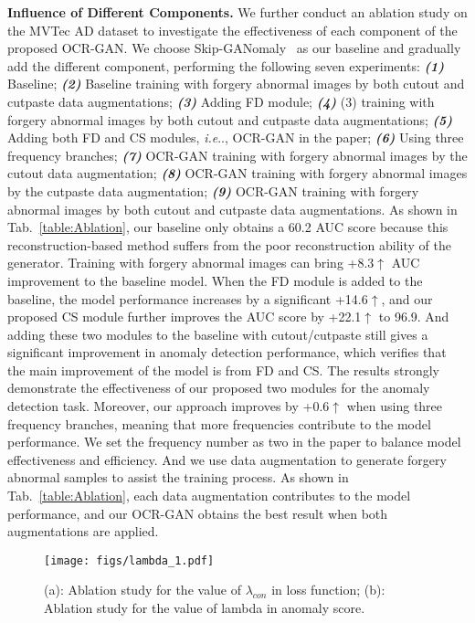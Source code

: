 \documentclass[lettersize,journal]{IEEEtran}
\makeatletter
\DeclareRobustCommand\onedot{\futurelet\@let@token\@onedot}
\def\@onedot{\ifx\@let@token.\else.\null\fi\xspace}
\def\ie{\emph{i.e}\onedot} \def\Ie{\emph{I.e}\onedot}
\makeatother
\begin{document}
\noindent\textbf{Influence of Different Components.} We further conduct an ablation study on the MVTec AD dataset to investigate the effectiveness of each component of the proposed OCR-GAN. We choose Skip-GANomaly~\cite{akccay2019skip} as our baseline and gradually add the different component, performing the following seven experiments: \textbf{\emph{(1)}} Baseline; \textbf{\emph{(2)}} Baseline training with forgery abnormal images by both cutout and cutpaste data augmentations; \textbf{\emph{(3)}} Adding FD module; \textbf{\emph{(4)}} (3) training with forgery abnormal images by both cutout and cutpaste data augmentations; \textbf{\emph{(5)}} Adding both FD and CS modules, \ie, OCR-GAN in the paper; \textbf{\emph{(6)}} Using three frequency branches; \textbf{\emph{(7)}} OCR-GAN training with forgery abnormal images by the cutout data augmentation; \textbf{\emph{(8)}} OCR-GAN training with forgery abnormal images by the cutpaste data augmentation; \textbf{\emph{(9)}} OCR-GAN training with forgery abnormal images by both cutout and cutpaste data augmentations. As shown in Tab.~\ref{table:Ablation}, our baseline only obtains a 60.2 AUC score because this reconstruction-based method suffers from the poor reconstruction ability of the generator. Training with forgery abnormal images can bring +8.3$\uparrow$ AUC improvement to the baseline model. When the FD module is added to the baseline, the model performance increases by a significant +14.6$\uparrow$, and our proposed CS module further improves the AUC score by +22.1$\uparrow$ to 96.9. And adding these two modules to the baseline with cutout/cutpaste still gives a significant improvement in anomaly detection performance, which verifies that the main improvement of the model is from FD and CS. The results strongly demonstrate the effectiveness of our proposed two modules for the anomaly detection task. Moreover, our approach improves by +0.6$\uparrow$ when using three frequency branches, meaning that more frequencies contribute to the model performance. We set the frequency number as two in the paper to balance model effectiveness and efficiency. And we use data augmentation to generate forgery abnormal samples to assist the training process. As shown in Tab.~\ref{table:Ablation}, each data augmentation contributes to the model performance, and our OCR-GAN obtains the best result when both augmentations are applied.
\begin{figure*}[t]
    \centering
    \texttt{[image: figs/lambda\_1.pdf]}
    \caption{(a): Ablation study for the value of $\lambda_{con}$ in loss function; (b): Ablation study for the value of lambda in anomaly score.}
    \label{fig:lambda}
\end{figure*}
\end{document}
